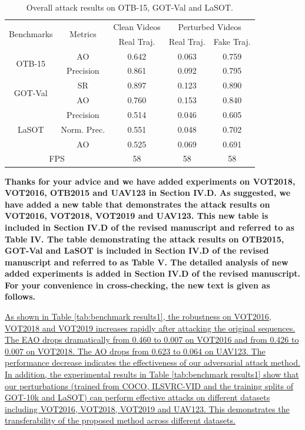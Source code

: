 \documentclass[12pt]{article}
\begin{document}
\begin{table}[t]
    \renewcommand\thetable{V}
    \centering
    \caption{Overall attack results on OTB-15, GOT-Val and LaSOT.}
    \begin{tabular}{c c | c | c | c}
    \toprule
    \multirow{2}{*}[-2pt]{Benchmarks} & \multirow{2}{*}[-2pt]{Metrics} & Clean Videos    & \multicolumn{2}{c}{Perturbed Videos}  \\
    \cmidrule{3-5}
                              &                         & Real Traj. & Real Traj. & Fake Traj.     \\ 
    \midrule
    \multirow{2}{*}{OTB-15} 
    & AO   & 0.642 & 0.063 & 0.759\\
    & Precision & 0.861 & 0.092 & 0.795\\
    \midrule
    \multirow{2}{*}{GOT-Val} 
    & SR & 0.897 & 0.123 & 0.890\\
    & AO & 0.760 & 0.153 & 0.840 \\
    \midrule
    \multirow{3}{*}{LaSOT} 
    & Precision  & 0.514 & 0.046 & 0.605\\
    & Norm. Prec.& 0.551 & 0.048 & 0.702\\
    & AO         & 0.525 & 0.069 & 0.691\\
    \midrule
    \multicolumn{2}{c|}{FPS} & 58 & 58 & 58\\
    \bottomrule
    \end{tabular}
    \label{tab:benchmark results}
\end{table}

\textbf{Thanks for your advice and we have added experiments on VOT2018, VOT2016, OTB2015 and UAV123 in Section IV.D.
As suggested, we have added a new table that demonstrates the attack results on VOT2016, VOT2018, VOT2019 and UAV123. This new table is included in Section IV.D of the revised manuscript and referred to as Table IV. The table demonstrating the attack results on OTB2015, GOT-Val and LaSOT is included in Section IV.D of the revised manuscript and referred to as Table V.
The detailed analysis of new added experiments is added in Section IV.D of the revised manuscript. For your convenience in cross-checking, the new text is given as follows.}

\uline{As shown in Table \ref{tab:benchmark results1}, the robustness on VOT2016, VOT2018 and VOT2019 increases rapidly after attacking the original sequences. The EAO drops dramatically from 0.460 to 0.007 on VOT2016 and from 0.426 to 0.007 on VOT2018. The AO drops from 0.623 to 0.064 on UAV123. The performance decrease indicates the effectiveness of our adversarial attack method.
In addition, the experimental results in Table \ref{tab:benchmark results1} show that our perturbations (trained from COCO, ILSVRC-VID and the training splits of GOT-10k and LaSOT) can perform effective attacks on different datasets including VOT2016, VOT2018, VOT2019 and UAV123. This demonstrates the transferability of the proposed method across different datasets.
}
\end{document}
